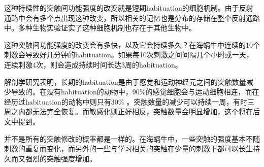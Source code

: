 \documentclass[UTF8,nofonts]{ctexart}
\begin{document}
\par
这种持续性的突触间功能强度的改变就是短期habituation的细胞机制。由于反射通路中会有多个点出现这种改变，所以相关的记忆也是分布的存储在整个反射通路中。多种生物实验证实了这种细胞机制也存在于其他生物中。
\par
这种突触间功能强度的改变会有多快，以及它会持续多久？在海蜗牛中连续的10个刺激会导致好几分钟的habituation。如果每10次刺激之间间隔几个小时或一天，连续刺激4次，则会造成持续时间长达3周的habituation。
\par
解剖学研究表明，长期的habituation是由于感觉和运动神经元之间的突触数量减少导致的。在没有habituation的动物中，90\%的感觉细胞会与运动细胞相连，而在经历过habituation的动物中则只有30\% 。突触数量的减少可以持续一周，有时三周之内都无法完全恢复。而敏感化则正好相反，突触数量会明显增加，这个将在后文中提到。
\par
并不是所有的突触修改的概率都是一样的。在海蜗牛中，一些突触的强度基本不随刺激的重复而变化，而另外的一些与学习相关的突触在少量的刺激下都可以长生持久而又强烈的突触强度增加。
\end{document}
